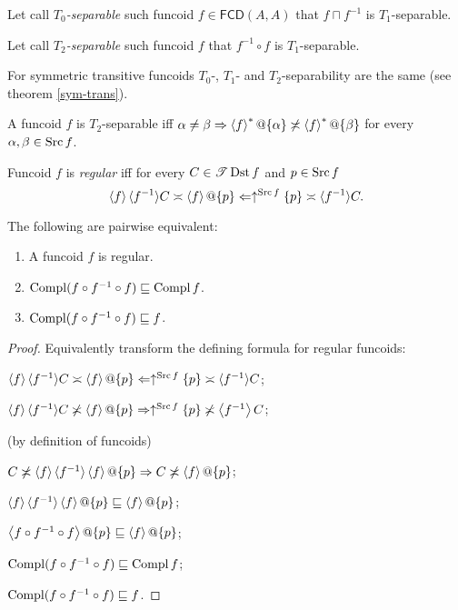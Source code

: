 \begin{defn}
Let call \emph{$T_{0}$-separable} such funcoid $f\in\mathsf{FCD}(A,A)$
that $f\sqcap f^{-1}$ is $T_{1}$-separable.
\end{defn}

\begin{defn}
Let call \emph{$T_{2}$-separable} such funcoid $f$ that $f^{-1}\circ f$
is $T_{1}$-separable.
\end{defn}
For symmetric transitive funcoids $T_{0}$-, $T_{1}$- and $T_{2}$-separability
are the same (see theorem \ref{sym-trans}).
\begin{obvious}
A funcoid $f$ is $T_{2}$-separable iff $\alpha\ne\beta\Rightarrow\left\langle f\right\rangle ^{\ast}@\{\alpha\}\not\asymp\left\langle f\right\rangle ^{\ast}@\{\beta\}$
for every $\alpha,\beta\in\operatorname{Src} f$.\end{obvious}
\begin{defn}
Funcoid $f$ is \emph{regular} iff for every $C\in\mathscr{T}\operatorname{Dst} f$ and
$p\in\operatorname{Src} f$
\[\left\langle f\right\rangle \langle f^{- 1} \rangle C \asymp \left\langle f\right\rangle
@\{ p \} \Leftarrow \uparrow^{\operatorname{Src} f} \{ p \}
\asymp \langle f^{- 1} \rangle C.\]
\end{defn}

\begin{prop}
The following are pairwise equivalent:
\begin{enumerate}
  \item A funcoid $f$ is regular.
  \item $\operatorname{Compl} (f \circ f^{- 1} \circ f) \sqsubseteq \operatorname{Compl} f$.
  \item $\operatorname{Compl} (f \circ f^{- 1} \circ f) \sqsubseteq f$.
\end{enumerate}
\end{prop}

\begin{proof}
Equivalently transform the defining formula for regular funcoids:

$\left\langle f\right\rangle \langle f^{- 1} \rangle C \asymp \left\langle f\right\rangle
@\{ p \} \Leftarrow \uparrow^{\operatorname{Src} f} \{ p \}
\asymp \langle f^{- 1} \rangle C$;

$\left\langle f\right\rangle \langle f^{- 1} \rangle C \not\asymp \left\langle f\right\rangle
@\{ p \} \Rightarrow \uparrow^{\operatorname{Src} f} \{ p \} \not\asymp \left\langle f^{-1}\right\rangle C$;

(by definition of funcoids)

$C \not\asymp \left\langle f\right\rangle \langle f^{- 1} \rangle \left\langle f\right\rangle
@\{ p \} \Rightarrow C \not\asymp \left\langle f\right\rangle
@\{ p \}$;

$\supfun{f} \langle f^{- 1} \rangle \supfun{f}
@\{ p \} \sqsubseteq \supfun{f}@\{ p \}$;

$\left\langle f \circ f^{- 1} \circ f\right\rangle @\{ p \}
\sqsubseteq \left\langle f\right\rangle @\{ p \}$;

$\operatorname{Compl} (f \circ f^{- 1} \circ f) \sqsubseteq \operatorname{Compl} f$;

$\operatorname{Compl} (f \circ f^{- 1} \circ f) \sqsubseteq f$.
\end{proof}

